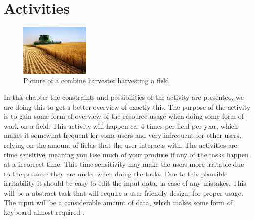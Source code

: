 \section{Activities}
\begin{figure}
\centering
\vspace{-10pt}
\includegraphics[width=0.3\textwidth, keepaspectratio]{images/pact/hoste}
\caption{\label{fig:activities}Picture of a combine harvester harvesting a field.}
\vspace{-10pt}
\end{figure}
In this chapter  the constraints and possibilities of the activity are presented, we are doing this to get a better overview of exactly this.
The purpose of the activity is to gain some form of overview of the resource usage when doing some form of work on a field.  This activity will happen ca. 4 times per field per year, which makes it somewhat frequent for some users and very infrequent for other users, relying on the amount of fields that the user interacts with. The activities are time sensitive, meaning you lose much of your produce if any of the tasks happen at a incorrect time. This time sensitivity may make the users more irritable due to the pressure they are under when doing the tasks. Due to this plausible irritability it should be easy to edit the input data, in case of any mistakes. This will be a abstract task that will require a user-friendly design, for proper usage. The input will be a considerable amount of data, which makes some form of keyboard almost required . 
